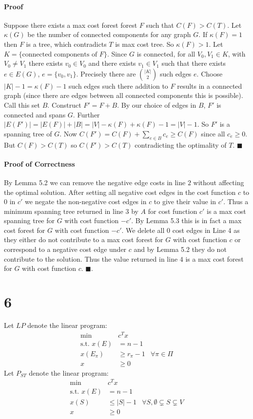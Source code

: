\documentclass[letterpaper,12pt,oneside,onecolumn]{report}
\begin{document}
\paragraph{Proof}
Suppose there exists a max cost forest forest $F$ such that $C(F) > C(T)$. Let $\kappa(G)$ be the number of connected components for any graph $G$. If $\kappa(F) = 1$ then $F$ is a tree, which contradicts $T$ is max cost tree.
So $\kappa(F) > 1$. Let $K = \{ \text{connected components of } F \}$. Since $G$ is connected, for all $V_0, V_1 \in K$, with $V_0 \neq V_1$ there exists $v_0 \in V_0$ and there exists $v_1 \in V_1$ such that there exists $e \in E(G)$, $e = \{v_0, v_1\}$. Precisely there are ${|K| \choose 2}$ such edges $e$. Choose $|K|  - 1 = \kappa(F) - 1$ such edges such there addition to $F$ results in a connected graph (since there are edges between all connected components this is possible).  Call this set $B$. Construct $F' = F + B$. By our choice of edges in $B$, $F'$ is connected and spans $G$. Further $|E(F')| = |E(F)| + |B| = |V| - \kappa(F) + \kappa(F) - 1 = |V| - 1$. So $F'$ is a spanning tree of $G$. Now $C(F') = C(F) + \sum_{e \in B} c_e \geq C(F)$ since all $c_e \geq 0$. But $C(F) > C(T)$ so $C(F') > C(T)$ contradicting the optimality of $T$. $\blacksquare$ 
\paragraph{Proof of Correctness}
By Lemma 5.2 we can remove the negative edge costs in line $2$ without affecting the optimal solution. After setting all negative cost edges in the cost function $c$ to $0$ in $c'$ we negate the non-negative cost edges in $c$ to give their value in $c'$. Thus a minimum spanning tree returned in line $3$ by $A$ for cost function $c'$ is a max cost spanning tree for $G$ with cost function $-c'$. By Lemma 5.3 this is in fact a max cost forest for $G$ with cost function $-c'$. We delete all $0$ cost edges in Line 4 as they either do not contribute to a max cost forest for $G$ with cost function $c$ or correspond to a negative cost edge under $c$ and by Lemma 5.2 they do not contribute to the solution. Thus the value returned in line $4$ is a max cost forest for $G$ with cost function $c$. $\blacksquare$.
\section*{6}
Let $LP$ denote the linear program:
\begin{align*}
\text{min } &c^Tx\\
\text{s.t. } x(E) &= n-1\\
x(E_\pi) &\geq r_\pi -1 &\forall \pi \in \Pi \\
x &\geq 0
\end{align*}
Let $P_{ST}$ denote the linear program:
\begin{align*}
\text{min } &c^Tx\\
\text{s.t. } x(E) &= n-1 \\
x(S) &\leq |S| -1 &\forall S, \emptyset \subsetneq S \subsetneq V\\
x &\geq 0
\end{align*}
\end{document}
